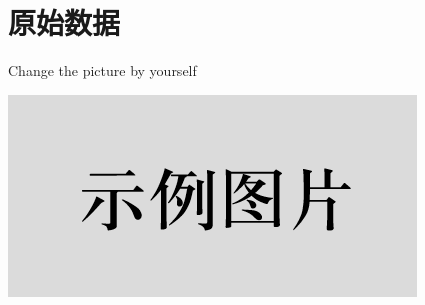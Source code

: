 \documentclass[UTF8]{ctexart}
\begin{document}
\newpage
\section{原始数据}
\begin{center}
    Change the picture by yourself
    
    
    \includegraphics{picture/example.png}
\end{center}




\end{document}
